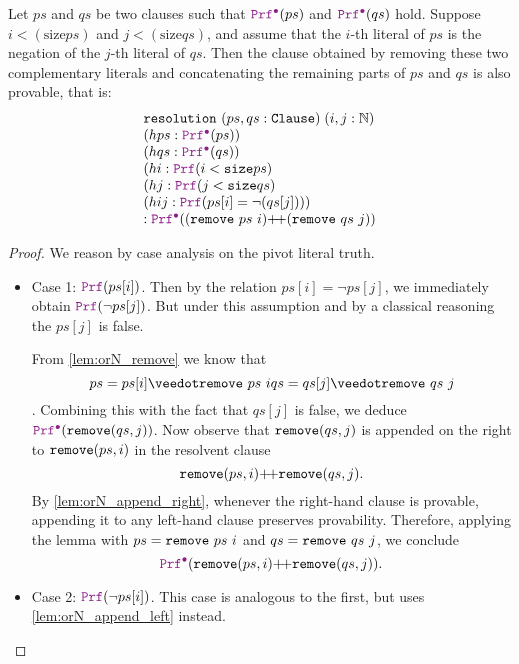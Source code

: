 \begin{theorem}[Resolution]\label{th:resolution}
Let $ps$ and $qs$ be two clauses such that $\prfcl(ps)$ and $\prfcl(qs)$ hold.
Suppose $i < (\mathrm{size} ps)$ and $j < (\mathrm{size} qs)$, and assume that the $i$-th literal of $ps$ is the negation of the $j$-th literal of $qs$.
Then the clause obtained by removing these two complementary literals and  concatenating the remaining parts of $ps$ and $qs$ is also provable, that is:
\[
\begin{array}{l}
  \tt{resolution}~(ps, qs : \tt{Clause})\; (i, j : \mathbb{N}) \\
  (hps : \prfcl(ps)) \\
  (hqs : \prfcl(qs)) \\
  (hi  : \prf(i < \tt{size} ps) \\
  (hj  : \prf(j < \tt{size} qs) \\
  (hij : \prf(ps[i] = \lnot(qs[j]))) \\
  : \prfcl((\tt{remove}~ps~i) \pp (\tt{remove}~qs~j))
\end{array}
\]
\begin{proof}
We reason by case analysis on the pivot literal truth.

\begin{itemize}
\item[] Case 1: \(\prf(ps[i])\).
  Then by the relation $ps[i] = \lnot ps[j]$, we immediately obtain $\prf(\lnot ps[j])$.
  But under this assumption and by a classical reasoning the $ps[j]$ is false.

  From \cref{lem:orN_remove} we know that
  \[
      ps = ps[i] \veedot \kw{remove}~ps~i\\
      qs = qs[j] \veedot \kw{remove}~qs~j
  \].
  Combining this with the fact that $qs[j]$ is false, we deduce $\prfcl(\kw{remove}(qs,j))$.
  Now observe that $\texttt{\upshape{remove}}(qs,j)$ is appended on the right to $\texttt{\upshape{remove}}(ps,i)$
  in the resolvent clause
  \[
    \texttt{\upshape{remove}}(ps,i)  {+}\!{+}  \texttt{\upshape{remove}}(qs,j).
  \]
  By \cref{lem:orN_append_right}, whenever the right-hand clause is provable,
  appending it to any left-hand clause preserves provability.
  Therefore, applying the lemma with $ps =\texttt{\upshape{remove}}~ps~i$ and $qs =\texttt{\upshape{remove}}~qs~j$,
  we conclude
  \[
    \prfcl(\kw{remove}(ps,i) \pp \kw{remove}(qs,j)).
  \]
\item[] Case 2: \(\prf(\lnot ps[i])\). This case is analogous to the first, but uses \cref{lem:orN_append_left} instead.
\end{itemize}
\end{proof}
\end{theorem}



